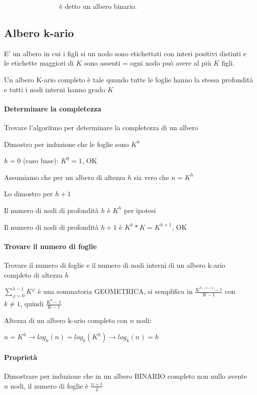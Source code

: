 {~~~~~~~~~~~~~~~~è detto un albero binario.}

\subsection{Albero k-ario}

{E' un albero in cui i figli si un nodo sono etichettati con interi positivi distinti e le etichette maggiori di $K$ sono assenti = ogni nodo può avere al più $K$ figli.}

{Un albero K-ario completo è tale quando tutte le foglie hanno la stessa profondità e tutti i nodi interni hanno grado $K$}

\paragraph{Determinare la completezza}

{Trovare l'algoritmo per determinare la completezza di un albero}

{Dimostro per induzione che le foglie sono $K^h$}

{$h=0$ (caso base): $K^0=1$, OK}

{Assumiamo che per un albero di altezza $h$ sia vero che $n=K^h$}

{Lo dimostro per $h+1$}

{Il numero di nodi di profondità $h$ è $K^h$ per ipotesi}

{Il numero di nodi di profondità $h+1$ è $K^h*K=K^{h+1}$, OK}

\paragraph{Trovare il numero di foglie}

{Trovare il numero di foglie e il numero di nodi interni di un albero k-ario completo di altezza $h$}

{$\sum_{\varphi=0}^{h-1}{K^{\varphi}}$ è una sommatoria GEOMETRICA, si semplifica in $\frac{K^{h-1+1}-1}{K-1}$ con $k\neq 1$, quindi $\frac{K^h-1}{K-1}$}

{Altezza di un albero k-ario completo con $n$ nodi:}

$n=K^h \rightarrow log_k(n) = log_k(K^h) \rightarrow log_k(n) = h$

\paragraph{Proprietà}

{Dimostrare per induzione che in un albero BINARIO completo non nullo avente $n$ nodi, il numero di foglie è $\frac{n+1}{2}$}

